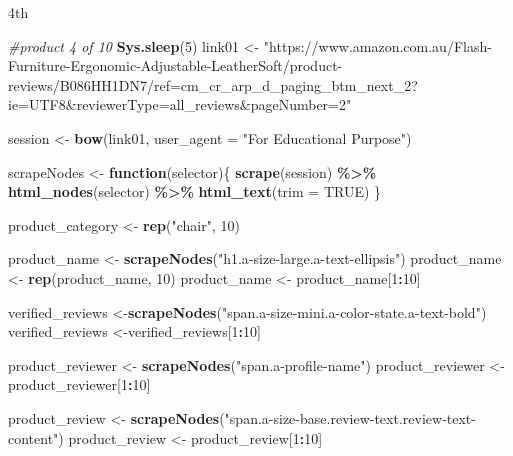 \documentclass[
]{article}
\newenvironment{Shaded}{\begin{snugshade}}{\end{snugshade}}
\newcommand{\AttributeTok}[1]{\textcolor[rgb]{0.13,0.29,0.53}{#1}}
\newcommand{\CommentTok}[1]{\textcolor[rgb]{0.56,0.35,0.01}{\textit{#1}}}
\newcommand{\ConstantTok}[1]{\textcolor[rgb]{0.56,0.35,0.01}{#1}}
\newcommand{\ControlFlowTok}[1]{\textcolor[rgb]{0.13,0.29,0.53}{\textbf{#1}}}
\newcommand{\DecValTok}[1]{\textcolor[rgb]{0.00,0.00,0.81}{#1}}
\newcommand{\FunctionTok}[1]{\textcolor[rgb]{0.13,0.29,0.53}{\textbf{#1}}}
\newcommand{\NormalTok}[1]{#1}
\newcommand{\OtherTok}[1]{\textcolor[rgb]{0.56,0.35,0.01}{#1}}
\newcommand{\SpecialCharTok}[1]{\textcolor[rgb]{0.81,0.36,0.00}{\textbf{#1}}}
\newcommand{\StringTok}[1]{\textcolor[rgb]{0.31,0.60,0.02}{#1}}
\begin{document}
4th

\begin{Shaded}
\begin{Highlighting}[]
\CommentTok{\#product 4 of 10}
   \FunctionTok{Sys.sleep}\NormalTok{(}\DecValTok{5}\NormalTok{)}
\NormalTok{link01 }\OtherTok{\textless{}{-}} \StringTok{"https://www.amazon.com.au/Flash{-}Furniture{-}Ergonomic{-}Adjustable{-}LeatherSoft/product{-}reviews/B086HH1DN7/ref=cm\_cr\_arp\_d\_paging\_btm\_next\_2?ie=UTF8\&reviewerType=all\_reviews\&pageNumber=2"}


\NormalTok{  session }\OtherTok{\textless{}{-}} \FunctionTok{bow}\NormalTok{(link01,}
               \AttributeTok{user\_agent =} \StringTok{"For Educational Purpose"}\NormalTok{)}

\NormalTok{  scrapeNodes }\OtherTok{\textless{}{-}} \ControlFlowTok{function}\NormalTok{(selector)\{}
    \FunctionTok{scrape}\NormalTok{(session) }\SpecialCharTok{\%\textgreater{}\%}
      \FunctionTok{html\_nodes}\NormalTok{(selector) }\SpecialCharTok{\%\textgreater{}\%}
      \FunctionTok{html\_text}\NormalTok{(}\AttributeTok{trim =} \ConstantTok{TRUE}\NormalTok{)}
\NormalTok{  \}}

\NormalTok{  product\_category }\OtherTok{\textless{}{-}} \FunctionTok{rep}\NormalTok{(}\StringTok{"chair"}\NormalTok{, }\DecValTok{10}\NormalTok{)}

\NormalTok{  product\_name }\OtherTok{\textless{}{-}} \FunctionTok{scrapeNodes}\NormalTok{(}\StringTok{"h1.a{-}size{-}large.a{-}text{-}ellipsis"}\NormalTok{)}
\NormalTok{  product\_name }\OtherTok{\textless{}{-}} \FunctionTok{rep}\NormalTok{(product\_name, }\DecValTok{10}\NormalTok{)}
\NormalTok{  product\_name }\OtherTok{\textless{}{-}}\NormalTok{ product\_name[}\DecValTok{1}\SpecialCharTok{:}\DecValTok{10}\NormalTok{]}
  
\NormalTok{  verified\_reviews }\OtherTok{\textless{}{-}}\FunctionTok{scrapeNodes}\NormalTok{(}\StringTok{"span.a{-}size{-}mini.a{-}color{-}state.a{-}text{-}bold"}\NormalTok{)}
\NormalTok{  verified\_reviews }\OtherTok{\textless{}{-}}\NormalTok{verified\_reviews[}\DecValTok{1}\SpecialCharTok{:}\DecValTok{10}\NormalTok{]}
  
\NormalTok{  product\_reviewer }\OtherTok{\textless{}{-}} \FunctionTok{scrapeNodes}\NormalTok{(}\StringTok{"span.a{-}profile{-}name"}\NormalTok{)}
\NormalTok{  product\_reviewer }\OtherTok{\textless{}{-}}\NormalTok{ product\_reviewer[}\DecValTok{1}\SpecialCharTok{:}\DecValTok{10}\NormalTok{]}
  
\NormalTok{  product\_review }\OtherTok{\textless{}{-}} \FunctionTok{scrapeNodes}\NormalTok{(}\StringTok{"span.a{-}size{-}base.review{-}text.review{-}text{-}content"}\NormalTok{)}
\NormalTok{  product\_review }\OtherTok{\textless{}{-}}\NormalTok{ product\_review[}\DecValTok{1}\SpecialCharTok{:}\DecValTok{10}\NormalTok{]}
  

\end{Highlighting}
\end{Shaded}
\end{document}
